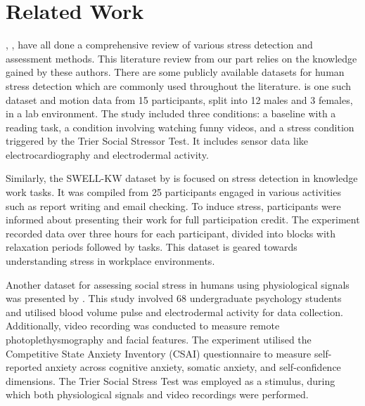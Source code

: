 \section{Related Work}

\Textcite{review1}, \textcite{arsalan}, \textcite{1} have all done a comprehensive review of various stress detection and assessment methods.  This literature review from our part relies on the knowledge gained by these authors.
There are some publicly available datasets for human stress detection which are commonly used throughout the literature. \textcite{wesad} is one such dataset and motion data from 15 participants, split into 12 males and 3 females, in a lab environment. The study included three conditions: a baseline with a reading task, a condition involving watching funny videos, and a stress condition triggered by the Trier Social Stressor Test. It includes sensor data like electrocardiography and electrodermal activity.

Similarly, the SWELL-KW dataset by \textcite{swell} is focused on stress detection in knowledge work tasks. It was compiled from 25 participants engaged in various activities such as report writing and email checking. To induce stress, participants were informed about presenting their work for full participation credit. The experiment recorded data over three hours for each participant, divided into blocks with relaxation periods followed by tasks. This dataset is geared towards understanding stress in workplace environments.

Another dataset for assessing social stress in humans using physiological signals was presented by \textcite{1234}. This study involved 68 undergraduate psychology students and utilised blood volume pulse and electrodermal activity for data collection. Additionally, video recording was conducted to measure remote photoplethysmography and facial features. The experiment utilised the Competitive State Anxiety Inventory (CSAI) questionnaire to measure self-reported anxiety across cognitive anxiety, somatic anxiety, and self-confidence dimensions. The Trier Social Stress Test was employed as a stimulus, during which both physiological signals and video recordings were performed.



